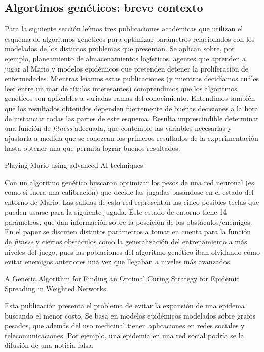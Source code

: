 \subsection{Algortimos genéticos: breve contexto}

Para la siguiente sección leímos tres publicaciones académicas que utilizan el esquema de algoritmos genéticos para optimizar parámetros relacionados con los modelados de los distintos problemas que presentan. Se aplican sobre, por ejemplo, planeamiento de almacenamientos logísticos\cite{warehouse}, agentes que aprenden a jugar al Mario\cite{mario} y modelos epidémicos que pretenden detener la proliferación de enfermedades\cite{epidemic}. Mientras leíamos estas publicaciones (y mientras decidíamos cuáles leer entre un mar de títulos interesantes) comprendimos que los algoritmos genéticos son aplicables a variadas ramas del conocimiento. Entendimos también que los resultados obtenidos dependen fuertemente de buenas decisiones a la hora de instanciar todas las partes de este esquema. Resulta imprescindible determinar una función de \emph{fitness} adecuada, que contemple las variables necesarias y ajustarla a medida que se conozcan los primeros resultados de la experimentación hasta obtener una que permita lograr buenos resultados.


Playing Mario using advanced AI techniques:

Con un algoritmo genético buscaron optimizar los pesos de una red neuronal (es como si fuera una calibración) que decide las jugadas basándose en el estado del entorno de Mario. Las salidas de esta red representan las cinco posibles teclas que pueden usarse para la siguiente jugada.
Este estado de entorno tiene 14 parámetros, que dan información sobre la poscición de los obstáculos/enemigos.
En el paper se discuten distintos parámetros a tomar en cuenta para la función de \emph{fitness} y ciertos obstáculos como la generalización del entrenamiento a más niveles del juego, pues las poblaciones del algoritmo genético iban olvidando cómo evitar enemigos anteriores una vez que llegaban a niveles más avanzados.

A Genetic Algorithm for Finding an Optimal Curing Strategy for Epidemic Spreading in Weighted Networks:

Esta publicación presenta el problema de evitar la expansión de una epidema buscando el menor costo. Se basa en modelos epidémicos modelados sobre grafos pesados, que además del uso medicinal tienen aplicaciones en redes sociales y telecomunicaciones. Por ejemplo, una epidemia en una red social podría se la difusión de una noticia falsa.

